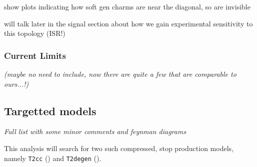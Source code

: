 show plots indicating how soft gen charms are near the diagonal, so are
invisible

will talk later in the signal section about how we gain experimental sensitivity
to this topology (ISR!)

\subsubsection{Current Limits}
\emph{(maybe no need to include, now there are quite a few that are comparable
to
ours...!)}

\subsection{Targetted models}
\emph{Full list with some minor comments and feynman diagrams}

This analysis will search for two such compressed, stop production models,
namely \texttt{T2cc} (\Ttwocc) and \texttt{T2degen} (\Ttwodegen).